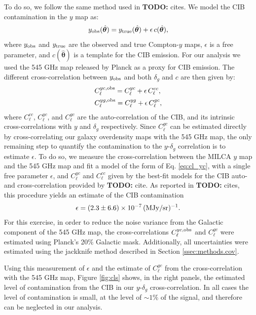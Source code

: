 \documentclass[useAMS,usenatbib]{mn2e}
\newcommand{\nv}{\hat{\boldsymbol{\theta}}}
\newcommand{\todo}[1]{{\bf TODO:} #1}
\begin{document}
      To do so, we follow the same method used in \todo{cites}. We model the CIB contamination in the $y$ map as:
      \begin{equation}
        y_{\rm obs}(\nv)=y_{\rm true}(\nv)+\epsilon\,c(\nv),
      \end{equation}
      where $y_{\rm obs}$ and $y_{\rm true}$ are the observed and true Compton-$y$ maps, $\epsilon$ is a free parameter, and $c(\nv)$ is a template for the CIB emission. For our analysis we used the 545 GHz map released by Planck as a proxy for CIB emission. The different cross-correlation between $y_{\rm obs}$ and both $\delta_g$ and $c$ are then given by:
      \begin{align}\label{eq:cl_yc}
        &C^{yc,{\rm obs}}_\ell= C^{yc}_\ell+\epsilon\,C^{cc}_\ell,\\
        &C^{yg,{\rm obs}}_\ell= C^{yg}_\ell+\epsilon\,C^{gc}_\ell,
      \end{align}
      where $C^{cc}_\ell$, $C^{yc}_\ell$,  and  $C^{gc}_\ell$ are the auto-correlation of the CIB, and its intrinsic cross-correlations with $y$ and $\delta_g$ respectively. Since $C^{gc}_\ell$ can be estimated directly by cross-correlating our galaxy overdensity maps with the 545 GHz map, the only remaining step to quantify the contamination to the $y$-$\delta_g$ correlation is to estimate $\epsilon$. To do so, we measure the cross-correlation between the MILCA $y$ map and the 545 GHz map and fit a model of the form of Eq. \ref{eq:cl_yc}, with a single free parameter $\epsilon$, and $C^{yc}_\ell$ and $C^{cc}_\ell$ given by the best-fit models for the CIB auto- and cross-correlation provided by \todo{cite}. As reported in \todo{cites}, this procedure yields an estimate of the CIB contamination
      \begin{equation}
        \epsilon=(2.3\pm6.6)\times10^{-7}\,({\rm MJy}/{\rm sr})^{-1}.
      \end{equation}
      For this exercise, in order to reduce the noise variance from the Galactic component of the 545 GHz map, the cross-correlations $C^{yc,{\rm obs}}_\ell$ and $C^{gc}_\ell$ were estimated using Planck's 20\% Galactic mask. Additionally, all uncertainties were estimated using the jackknife method described in Section \ref{ssec:methods.cov}.
      
      Using this measurement of $\epsilon$ and the estimate of $C^{gc}_\ell$ from the cross-correlation with the 545 GHz map, Figure \ref{fig:cls} shows, in the right panels, the estimated level of contamination from the CIB in our $y$-$\delta_g$ cross-correlation. In all cases the level of contamination is small, at the level of $\sim1\%$ of the signal, and therefore can be neglected in our analysis.
\end{document}
